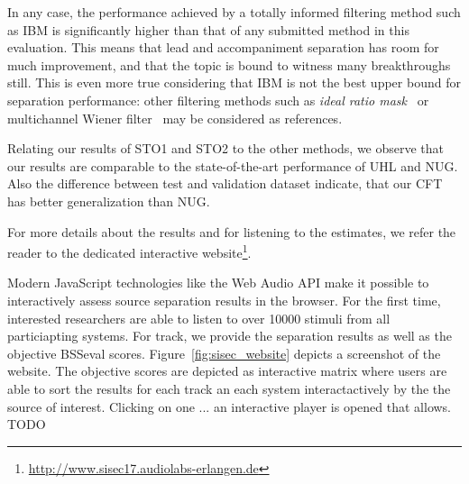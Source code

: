 {{%
In any case, the performance achieved by a totally informed filtering method such as IBM is significantly higher than that of any submitted method in this evaluation. This means that lead and accompaniment separation has room for much improvement, and that the topic is bound to witness many breakthroughs still. This is even more true considering that IBM is not the best upper bound for separation performance: other filtering methods such as \textit{ideal ratio mask}~\cite{liutkus15c} or multichannel Wiener filter~\cite{duong10} may be considered as references.
\par
Relating our results of STO1 and STO2 to the other methods, we observe that our results are comparable to the state-of-the-art performance of UHL and NUG.
Also the difference between test and validation dataset indicate, that our CFT has better generalization than NUG.

For more details about the results and for listening to the estimates, we refer the reader to the dedicated interactive website\footnote{\url{http://www.sisec17.audiolabs-erlangen.de}}.

Modern JavaScript technologies like the Web Audio API make it possible to interactively assess source separation results in the browser.
For the first time, interested researchers are able to listen to over 10000 stimuli from all particiapting systems.
For track, we provide the separation results as well as the objective BSSeval scores.
Figure~\ref{fig:sisec_website} depicts a screenshot of the website.
The objective scores are depicted as interactive matrix where users are able to sort the results for each track an each system interactactively by the the source of interest.
Clicking on one ... an interactive player is opened that allows.
TODO


}}
